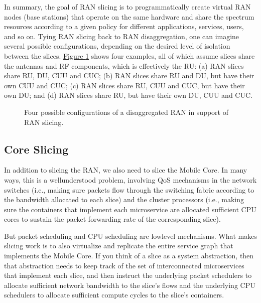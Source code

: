\documentclass[a4paper,11pt,english]{sphinxmanual}
\let\sphinxpxdimen\pdfpxdimen\else\newdimen\sphinxpxdimen
\begin{document}
\sphinxAtStartPar
In summary, the goal of RAN slicing is to programmatically create
virtual RAN nodes (base stations) that operate on the same hardware
and share the spectrum resources according to a given policy for
different applications, services, users, and so on. Tying RAN slicing
back to RAN disaggregation, one can imagine several possible
configurations, depending on the desired level of isolation between
the slices. \hyperref[\detokenize{disaggregate:fig-ran-slicing}]{Figure \ref{\detokenize{disaggregate:fig-ran-slicing}}} shows four examples,
all of which assume slices share the antennas and RF components, which
is effectively the RU: (a) RAN slices share RU, DU, CU\sphinxhyphen{}U and CU\sphinxhyphen{}C; (b)
RAN slices share RU and DU, but have their own CU\sphinxhyphen{}U and CU\sphinxhyphen{}C; (c) RAN
slices share RU, CU\sphinxhyphen{}U and CU\sphinxhyphen{}C, but have their own DU; and (d) RAN
slices share RU, but have their own DU, CU\sphinxhyphen{}U and CU\sphinxhyphen{}C.

\begin{figure}[ht]
\centering
\capstart

\noindent\sphinxincludegraphics[width=700\sphinxpxdimen]{{Slide40}.png}
\caption{Four possible configurations of a disaggregated RAN in support of
RAN slicing.}\label{\detokenize{disaggregate:id9}}\label{\detokenize{disaggregate:fig-ran-slicing}}\end{figure}


\subsection{Core Slicing}
\label{\detokenize{disaggregate:core-slicing}}
\sphinxAtStartPar
In addition to slicing the RAN, we also need to slice the Mobile Core.
In many ways, this is a well\sphinxhyphen{}understood problem, involving QoS
mechanisms in the network switches (i.e., making sure packets flow
through the switching fabric according to the bandwidth allocated to
each slice) and the cluster processors (i.e., making sure the containers
that implement each microservice are allocated sufficient CPU cores to
sustain the packet forwarding rate of the corresponding slice).

\sphinxAtStartPar
But packet scheduling and CPU scheduling are low\sphinxhyphen{}level mechanisms. What
makes slicing work is to also virtualize and replicate the entire
service graph that implements the Mobile Core. If you think of a slice as
a system abstraction, then that abstraction needs to keep track of the
set of interconnected microservices that implement each slice,
and then instruct the underlying packet schedulers to allocate
sufficient network bandwidth to the slice’s flows and the underlying CPU
schedulers to allocate sufficient compute cycles to the slice’s
containers.
\end{document}
